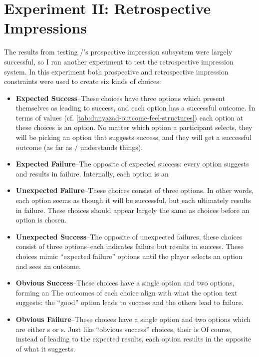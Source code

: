 \section{Experiment II: Retrospective Impressions}

\label{sec:exp-retrospective}

The results from testing \dunyazad/'s prospective impression subsystem were largely successful, so I ran another experiment to test the retrospective impression system.
%
In this experiment both prospective and retrospective impression constraints were used to create six kinds of choices:

\begin{itemize}
  \item \textbf{Expected Success}--These choices have three options which present themselves as leading to success, and each option has a successful outcome. In terms of  values (cf. \cref{tab:dunyazad-outcome-feel-structures}) each option at these choices is an \exps option. No matter which option a participant selects, they will be picking an option that suggests success, and they will get a successful outcome (as far as \dunyazad/ understands things).
  \item \textbf{Expected Failure}--The opposite of expected success: every option suggests and results in failure. Internally, each option is an 
  \item \textbf{Unexpected Failure}--These choices consist of three  options. In other words, each option seems as though it will be successful, but each ultimately results in failure. These choices should appear largely the same as \exps{} choices before an option is chosen.
  \item \textbf{Unexpected Success}--The opposite of unexpected failures, these choices consist of three  options--each indicates failure but results in success. These choices mimic ``expected failure'' options until the player selects an option and sees an outcome.
  \item \textbf{Obvious Success}--These choices have a single \exps{} option and two \expf{} options, forming an \obv{}  The outcomes of each choice align with what the option text suggests: the ``good'' option leads to success and the others lead to failure.
  \item \textbf{Obvious Failure}--These choices have a single  option and two options which are either s or s. Just like ``obvious success'' choices, their  is  Of course, instead of leading to the expected results, each option results in the opposite of what it suggests.
\end{itemize}

